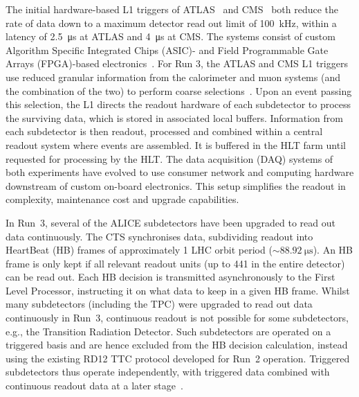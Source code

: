 The initial hardware-based L1 triggers of ATLAS~\cite{ATLASRun3Detector} and CMS~\cite{CMS:run3-detector} both reduce the rate of data down to a maximum detector read out limit of \SI{100}{\kilo\hertz}, within a latency of \SI{2.5}{\micro\second} at ATLAS and \SI{4}{\micro\second} at CMS. 
The systems consist of custom Algorithm Specific Integrated Chips (ASIC)- and Field Programmable Gate Arrays (FPGA)-based electronics~\cite{asics-fpgas}. 
For Run 3, the ATLAS and CMS L1 triggers use reduced granular information from the calorimeter and muon systems (and the combination of the two) to perform coarse selections~\cite{ATLASTriggerRun3, cms2020performance}. 
Upon an event passing this selection, the L1 directs the readout hardware of each subdetector to process the surviving data, which is stored in associated local buffers. 
Information from each subdetector is  then readout, processed and combined within a central readout system where events are assembled. 
It is buffered in the HLT farm until requested for processing by the HLT. 
The data acquisition (DAQ) systems of both experiments have evolved to use consumer network and computing hardware downstream of custom on-board electronics. 
This setup simplifies the readout in complexity, maintenance cost and upgrade capabilities. 


In Run~3, several of the ALICE subdetectors have been upgraded to read out data continuously. The CTS synchronises data, subdividing readout into HeartBeat (HB) frames of approximately 1 LHC orbit period ($\sim\SI{88.92}{\micro\second}$). An HB frame is only kept if all relevant readout units (up to 441 in the entire detector) can be read out. Each HB decision is transmitted asynchronously to the First Level Processor, instructing it on what data to keep in a given HB frame. Whilst many subdetectors (including the TPC) were upgraded to read out data continuously in Run~3, continuous readout is not possible for some subdetectors, e.g.,  the Transition Radiation Detector. Such subdetectors are operated on a triggered basis and are hence excluded from the HB decision calculation, instead using the existing RD12 TTC protocol developed for Run~2 operation. Triggered subdetectors thus operate independently, with triggered data combined with continuous readout data at a later stage~\cite{alice-trigger-run3}.

